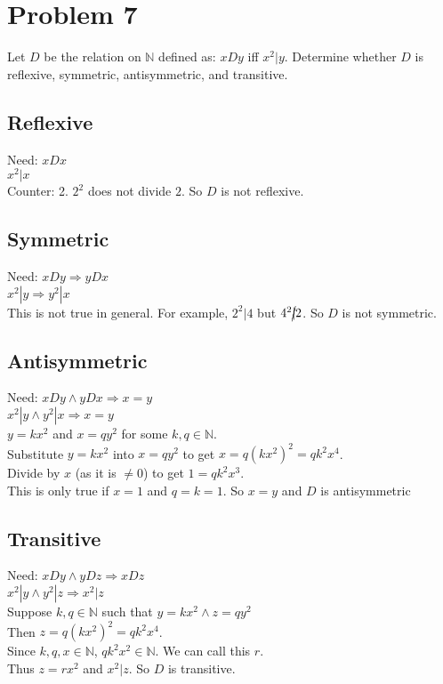 \documentclass{article}
\begin{document}
\section*{Problem 7}
Let $D$ be the relation on $\mathbb{N}$ defined as: $x D y$ iff $x^2 | y$. Determine whether $D$ is reflexive, symmetric, antisymmetric, and transitive.
\subsection*{Reflexive}
Need: $x D x$ \\
$x^2 | x$ \\
Counter: 2. $2^2$ does not divide $2$. So $D$ is not reflexive.
\subsection*{Symmetric}
Need: $x D y \Rightarrow y D x$ \\
$x^2 | y \Rightarrow y^2 | x$ \\
This is not true in general. For example, $2^2 | 4$ but $4^2 \cancel{|} 2$. So $D$ is not symmetric.
\subsection*{Antisymmetric}
Need: $x D y \land y D x \Rightarrow x = y$ \\
$x^2 | y \land y^2 | x \Rightarrow x = y$ \\
$y = kx^2$ and $x = qy^2$ for some $k, q \in \mathbb{N}$. \\
Substitute $y = kx^2$ into $x = qy^2$ to get $x = q(kx^2)^2 = qk^2x^4$. \\
Divide by $x$ (as it is $\neq 0$) to get $1 = qk^2x^3$. \\
This is only true if $x = 1$ and $q = k = 1$. So $x = y$ and $D$ is antisymmetric
\subsection*{Transitive}
Need: $x D y \land y D z \Rightarrow x D z$ \\
$x^2 | y \land y^2 | z \Rightarrow x^2 | z$ \\
Suppose  $k, q \in \mathbb{N}$ such that $y = kx^2 \land z = qy^2$ \\
Then $z = q(kx^2)^2 = qk^2x^4$. \\
Since $k, q, x \in \mathbb{N}$, $qk^2x^2 \in \mathbb{N}$. We can call this $r$. \\
Thus $z = rx^2$ and $x^2 | z$. So $D$ is transitive.
\end{document}
